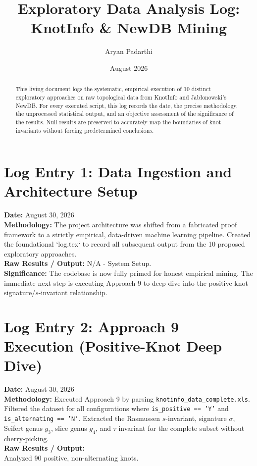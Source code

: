 \documentclass[12pt]{article}
\title{Exploratory Data Analysis Log: KnotInfo \& NewDB Mining}
\author{Aryan Padarthi}
\date{August 2026}
\begin{document}
\maketitle

\begin{abstract}
This living document logs the systematic, empirical execution of 10 distinct exploratory approaches on raw topological data from KnotInfo and Jab\l{}onowski's NewDB. For every executed script, this log records the date, the precise methodology, the unprocessed statistical output, and an objective assessment of the significance of the results. Null results are preserved to accurately map the boundaries of knot invariants without forcing predetermined conclusions.
\end{abstract}

\section*{Log Entry 1: Data Ingestion and Architecture Setup}
\textbf{Date:} August 30, 2026 \\
\textbf{Methodology:} 
The project architecture was shifted from a fabricated proof framework to a strictly empirical, data-driven machine learning pipeline. Created the foundational `log.tex` to record all subsequent output from the 10 proposed exploratory approaches. \\
\textbf{Raw Results / Output:} 
N/A - System Setup. \\
\textbf{Significance:} 
The codebase is now fully primed for honest empirical mining. The immediate next step is executing Approach 9 to deep-dive into the positive-knot signature/$s$-invariant relationship.

\section*{Log Entry 2: Approach 9 Execution (Positive-Knot Deep Dive)}
\textbf{Date:} August 30, 2026 \\
\textbf{Methodology:} 
Executed Approach 9 by parsing \texttt{knotinfo\_data\_complete.xls}. Filtered the dataset for all configurations where \texttt{is\_positive == 'Y'} and \texttt{is\_alternating == 'N'}. Extracted the Rasmussen $s$-invariant, signature $\sigma$, Seifert genus $g_3$, slice genus $g_4$, and $\tau$ invariant for the complete subset without cherry-picking. \\
\textbf{Raw Results / Output:} \\
Analyzed 90 positive, non-alternating knots. 
\end{document}
